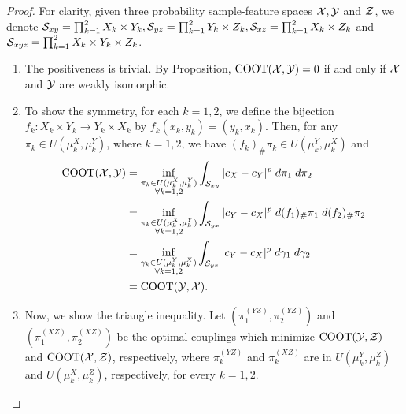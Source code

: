 \begin{proof}
    For clarity, given three probability sample-feature spaces $\mathcal X, \mathcal Y$ and $\mathcal Z$,
    we denote $\mathcal S_{xy} = \prod_{k=1}^2 X_k \times Y_k, \mathcal S_{yz} = \prod_{k=1}^2 Y_k \times Z_k,
    \mathcal S_{xz} = \prod_{k=1}^2 X_k \times Z_k$ and $\mathcal S_{xyz} = \prod_{k=1}^2 X_k \times Y_k \times Z_k$.
    \begin{enumerate}
      \item The positiveness is trivial. By Proposition, $\text{COOT}(\mathcal X, \mathcal Y) = 0$ if and only if
      $\mathcal X$ and $\mathcal Y$ are weakly isomorphic.

      \item To show the symmetry, for each $k = 1, 2$, we define the bijection
      $f_k: X_k \times Y_k \to Y_k \times X_k$ by $f_k(x_k,y_k) = (y_k,x_k)$.
      Then, for any $\pi_k \in U(\mu_k^X, \mu_k^Y)$, where $k=1,2$, we have
      $(f_k)_{\#} \pi_k \in U(\mu_k^Y, \mu_k^X)$ and
      \begin{equation}
        \begin{split}
          \text{COOT}(\mathcal X, \mathcal Y) &= \inf_{\substack{\pi_k \in U(\mu^X_k, \mu^Y_k) \\
          \forall k = 1,2}} \int_{\mathcal S_{xy}} \vert c_X - c_Y \vert^p \; d \pi_1 \; d \pi_2 \\
          &= \inf_{\substack{\pi_k \in U(\mu^X_k, \mu^Y_k) \\
          \forall k = 1,2}} \int_{\mathcal S_{yx}} \vert c_Y - c_X \vert^p \; d (f_1)_{\#} \pi_1 \; d (f_2)_{\#} \pi_2 \\
          &= \inf_{\substack{\gamma_k \in U(\mu^Y_k, \mu^X_k) \\
          \forall k = 1,2}} \int_{\mathcal S_{yx}} \vert c_Y - c_X \vert^p \; d \gamma_1 \; d \gamma_2 \\
          &= \text{COOT}(\mathcal Y, \mathcal X).
        \end{split}
      \end{equation}

      \item Now, we show the triangle inequality. Let $(\pi^{(YZ)}_1, \pi^{(YZ)}_2)$ and
      $(\pi^{(XZ)}_1, \pi^{(XZ)}_2)$ be the optimal couplings which minimize
      $\text{COOT}(\mathcal Y, \mathcal Z)$ and $\text{COOT}(\mathcal X, \mathcal Z)$, respectively, where
      $\pi^{(YZ)}_k$ and $\pi^{(XZ)}_k$ are in $U(\mu_k^Y, \mu_k^Z)$ and $U(\mu_k^X, \mu_k^Z)$,
      respectively, for every $k=1,2$.


\end{enumerate}
\end{proof}
